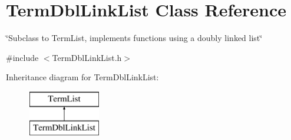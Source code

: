 \hypertarget{classTermDblLinkList}{\section{Term\-Dbl\-Link\-List Class Reference}
\label{classTermDblLinkList}
}


\char`\"{}\-Subclass to Term\-List, implements functions using a doubly linked list\char`\"{}  




{\ttfamily \#include $<$Term\-Dbl\-Link\-List.\-h$>$}

Inheritance diagram for Term\-Dbl\-Link\-List\-:\begin{figure}[H]
\begin{center}
\leavevmode
\includegraphics[height=2.000000cm]{classTermDblLinkList}
\end{center}
\end{figure}
